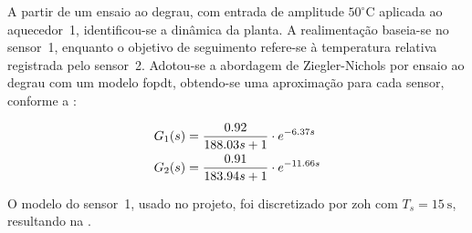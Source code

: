 A partir de um ensaio ao degrau, com entrada de amplitude $50^\circ\mathrm{C}$
aplicada ao aquecedor~1, identificou-se a dinâmica da planta. A realimentação
baseia-se no sensor~1, enquanto o objetivo de seguimento refere-se à temperatura
relativa registrada pelo sensor~2. Adotou-se a abordagem de Ziegler-Nichols por
ensaio ao degrau com um modelo \gls{fopdt}, obtendo-se uma aproximação para cada
sensor, conforme a :

\begin{align}
\eqlabel{planta-sensor-1-zn}
G_{1}(s) &= \frac{0.92}{188.03s + 1} \cdot e^{-6.37s}\\
\eqlabel{planta-sensor-2-zn}
G_{2}(s) &= \frac{0.91}{183.94s + 1} \cdot e^{-11.66s}
\end{align}

O modelo do sensor~1, usado no projeto, foi discretizado por \gls{zoh} com
$T_s = \SI{15}{\second}$, resultando na .